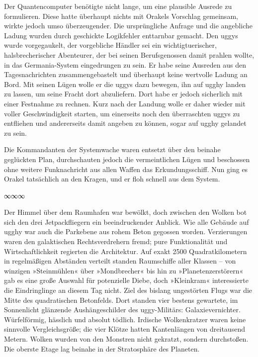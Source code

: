 Der Quantencomputer benötigte nicht lange, um eine plausible Ausrede zu formulieren. Diese hatte überhaupt nichts mit Orakels Vorschlag gemeinsam, wirkte jedoch umso überzeugender. Die ursprüngliche Anfrage und die angebliche Ladung wurden durch geschickte Logikfehler enttarnbar gemacht. Den uggys wurde vorgegaukelt, der vorgebliche Händler sei ein wichtigtuerischer, halsbrecherischer Abenteurer, der bei seinen Berufsgenossen damit prahlen wollte, in das Germania-System eingedrungen zu sein. Er habe seine Ausreden aus den Tagesnachrichten zusammengebastelt und überhaupt keine wertvolle Ladung an Bord. Mit seinen Lügen wolle er die uggys dazu bewegen, ihn auf ugghy landen zu lassen, um seine Fracht dort abzuliefern. Dort habe er jedoch sicherlich mit einer Festnahme zu rechnen. Kurz nach der Landung wolle er daher wieder mit voller Geschwindigkeit starten, um einerseits noch den überraschten uggys zu entfliehen und andererseits damit angeben zu können, sogar auf ugghy gelandet zu sein.

Die Kommandanten der Systemwache waren entsetzt über den beinahe geglückten Plan, durchschauten jedoch die vermeintlichen Lügen und beschossen ohne weitere Funknachricht aus allen Waffen das Erkundungsschiff. Nun ging es Orakel tatsächlich an den Kragen, und er floh schnell aus dem System.

\begin{center}
∞∞∞
\end{center}

Der Himmel über dem Raumhafen war bewölkt, doch zwischen den Wolken bot sich den drei Jetpackfliegern ein beeindruckender Anblick. Wie alle Gebäude auf ugghy war auch die Parkebene aus rohem Beton gegossen worden. Verzierungen waren den galaktischen Rechtsverdrehern fremd; pure Funktionalität und Wirtschaftlichkeit regierten die Architektur. Auf exakt 2500 Quadratkilometern in regelmäßigen Abständen verteilt standen Raumschiffe aller Klassen – von winzigen »Steinmühlen« über »Mondbrecher« bis hin zu »Planetenzerstörern« gab es eine große Auswahl für potenzielle Diebe, doch »Kleinkram« interessierte die Eindringlinge an diesem Tag nicht. Ziel des bislang ungestörten Flugs war die Mitte des quadratischen Betonfelds. Dort standen vier bestens gewartete, im Sonnenlicht glänzende Aushängeschilder des uggy-Militärs: Galaxievernichter. Würfelförmig, hässlich und absolut tödlich. Irdische Wolkenkratzer waren keine sinnvolle Vergleichsgröße; die vier Klötze hatten Kantenlängen von dreitausend Metern. Wolken wurden von den Monstren nicht gekratzt, sondern durchstoßen. Die oberste Etage lag beinahe in der Stratosphäre des Planeten.

